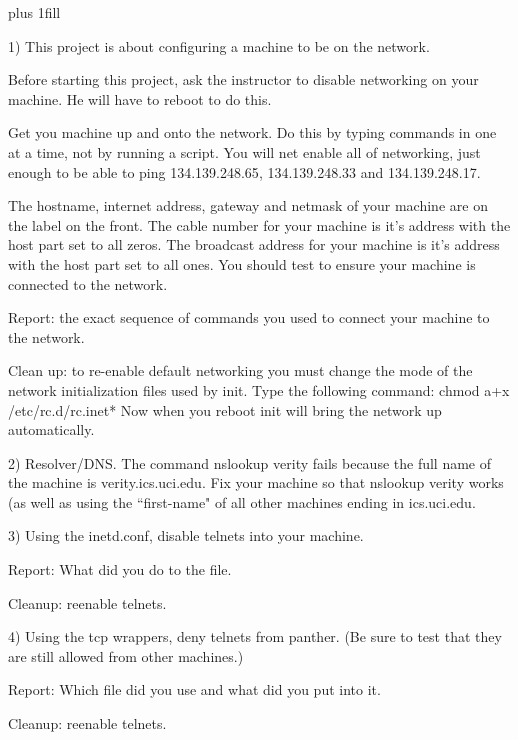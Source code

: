 
\rightskip=0pt plus 1fill

\parindent 0pt

1) This project is about configuring a machine to be on the network.

Before starting this project, ask the instructor to disable networking
on your machine. He will have to reboot to do this.

Get you machine up and onto the network.
Do this by typing commands in one at a time, not by running a script.
You will net enable all of networking, just enough to be
able to ping {\ltt{}134.139.248.65}, {\ltt{}134.139.248.33}
and {\ltt{}134.139.248.17}.

The hostname, internet address, gateway and netmask of your machine are
on the label on the front.
The cable number for your machine is it's address with the host
part set to all zeros.
The broadcast address for your machine is it's address with the host
part set to all ones.
You should test to ensure your machine is connected to the network.

Report: the exact sequence of commands you used to connect your machine
to the network.

Clean up: to re-enable default networking you must change the mode
of the network initialization files used by {\ltt{}init}.
Type the following command:
\hfill\break
{\ltt{}chmod a+x /etc/rc.d/rc.inet*}
\hfill\break
Now when you reboot {\ltt{}init} will bring the network up automatically.

2) Resolver/DNS. The command {\ltt{}nslookup verity} fails because the full name
of the machine is {\ltt{}verity.ics.uci.edu}.
Fix your machine so that {\ltt{}nslookup verity} works (as well as using
the ``first-name" of all other machines ending in {\ltt{}ics.uci.edu}.

3) Using the {\ltt{}inetd.conf}, disable telnets into your machine.

Report: What did you do to the file.

Cleanup: reenable telnets.

4) Using the tcp wrappers, deny telnets from {\ltt{}panther}. (Be sure to test
that they are still allowed from other machines.)

Report: Which file did you use and what did you put into it.

Cleanup: reenable telnets.

